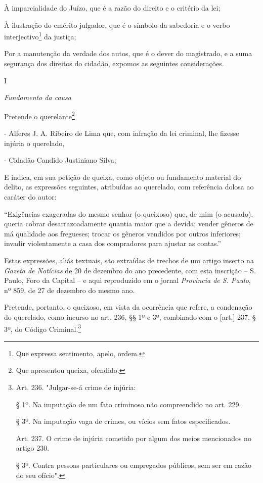 À imparcialidade do Juízo, que é a razão do direito e o critério da lei;

À ilustração do emérito julgador, que é o símbolo da sabedoria e o verbo
interjectivo\footnote{Que expressa sentimento, apelo, ordem.} da
justiça;

Por a manutenção da verdade dos autos, que é o dever do magistrado, e a
suma segurança dos direitos do cidadão, expomos as seguintes
considerações.

I

\emph{Fundamento da causa}

Pretende o querelante\footnote{Que apresentou queixa, ofendido.}

- Alferes J. A. Ribeiro de Lima que, com infração da lei criminal, lhe
fizesse injúria o querelado,

- Cidadão Candido Justiniano Silva;

E indica, em sua petição de queixa, como objeto ou fundamento material
do delito, as expressões seguintes, atribuídas ao querelado, com
referência dolosa ao caráter do autor:

``Exigências exageradas do mesmo senhor (o queixoso) que, de mim (o
acusado), queria cobrar desarrazoadamente quantia maior que a devida;
vender gêneros de má qualidade aos fregueses; trocar os gêneros vendidos
por outros inferiores; invadir violentamente a casa dos compradores para
ajustar as contas.''

Estas expressões, aliás textuais, são extraídas de trechos de um artigo
inserto na \emph{Gazeta de Notícias} de 20 de dezembro do ano
precedente, com esta inscrição -- S. Paulo, Foro da Capital -- e aqui
reproduzido em o jornal \emph{Província de S. Paulo}, nº 859, de 27 de
dezembro do mesmo ano.

Pretende, portanto, o queixoso, em vista da ocorrência que refere, a
condenação do querelado, como incurso no art. 236, §§ 1º e 3º, combinado
com o {[}art.{]} 237, § 3º, do Código Criminal.\footnote{Art. 236.
  "Julgar-se-á crime de injúria:

  § 1º. Na imputação de um fato criminoso não compreendido no art. 229.

  § 3º. Na imputação vaga de crimes, ou vícios sem fatos especificados.

  Art. 237. O crime de injúria cometido por algum dos meios mencionados
  no artigo 230.

  § 3º. Contra pessoas particulares ou empregados públicos, sem ser em
  razão do seu ofício".}

